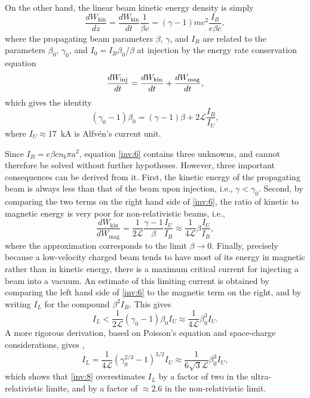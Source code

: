 \documentclass [12pt,a4paper,     ]{report} %
\begin{document}
    On the other hand, the linear beam kinetic energy density is simply
%
\begin{equation}\label{inv:4} %
     \frac{d W_{\text{kin}}}{d z}
   = \frac{d W_{\text{kin}}}{d t} \frac{1}{\beta c}
   =  (\gamma -1) mc^2 \frac{I_B}{e\beta c},
\end{equation}
%
where the propagating beam parameters $\beta$, $\gamma$, and $I_B$ are related to the parameters $\beta_0$, $\gamma_0$, and $I_0=I_B\beta_0/\beta$ at injection by the energy rate conservation equation
%
\begin{equation}\label{inv:5} %
        \frac{d W_{\text{\text{inj}}}}{d t}
     =  \frac{d W_{\text{kin}}}{d t}
     +  \frac{d W_{\text{mag}}}{d t},
\end{equation}
%
which gives the identity
%
\begin{equation}\label{inv:6} %
       (\gamma_0 -1)\beta_0
        = (\gamma -1)\beta
        + 2 \mathcal{L} \frac{I_B}{I_U},
\end{equation}
%
where $I_U \approx 17$~kA is Alfv\'en's current unit.

   Since $I_B=e\beta c n_b \pi a^2$,  equation \eqref{inv:6}  contains three unknowns, and cannot therefore be solved without further hypotheses.  However, three important consequences can be derived from it. First, the kinetic energy of the propagating beam is always less than that of the beam upon injection, i.e., $\gamma < \gamma_0$.  Second, by comparing the two terms on the right hand side of  \eqref{inv:6}, the ratio of kinetic to magnetic energy is very poor for non-relativistic beams, i.e., 
%
\begin{equation}\label{inv:7} %
           \frac{d W_{\text{kin}}}{d W_{\text{mag}}}
       =   \frac{1}{2\mathcal{L}} \frac{\gamma-1}{\beta} \frac{I_U}{I_B}
   \approx \frac{1}{4\mathcal{L}}                 \beta  \frac{I_U}{I_B},
\end{equation} 
%
where the approximation corresponds to the limit $\beta \rightarrow 0$.  Finally, precisely because a low-velocity charged beam tends to have most of its energy in magnetic rather than in kinetic energy, there is a maximum critical current for injecting a beam into a vacuum.  An estimate of this limiting current is obtained by comparing the left hand side of \eqref{inv:6} to the magnetic term on the right, and by writing  $I_L$ for the compound $\beta^2I_B$.  This gives
%
\begin{equation}\label{inv:8} %
    I_L <  \frac{1}{2\mathcal{L}}   (\gamma_0 - 1)\beta_0   I_U
     \approx \frac{1}{4\mathcal{L}}                 \beta_0^3 I_U.
\end{equation} 
%
A more rigorous derivation, based on Poisson's equation and space-charge considerations, gives \cite{BOGDA1971-,THODE1979-}, \cite[p.90]{MILLE1982-}
%
\begin{equation}\label{inv:9} %
    I_L =  \frac{1}{4\mathcal{L}}   (\gamma_0^{2/3} - 1)^{3/2}  I_U
   \approx \frac{1}{6\sqrt{3}\mathcal{L}}  \beta_0^3  I_U,
\end{equation} 
%
which shows that \eqref{inv:8} overestimates $I_L$ by a factor of two in the ultra-relativistic limite, and by a factor of $\approx$2.6 in the non-relativistic limit.
\end{document}
